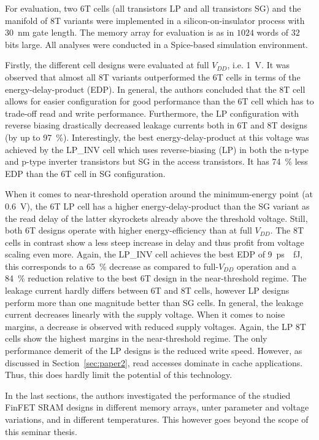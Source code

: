 \documentclass[conference]{IEEEtran}
\begin{document}
For evaluation, two 6T cells (all transistors LP and all transistors SG) and the manifold of 8T variants were implemented in a silicon-on-insulator process with \SI{30}{nm} gate length. The memory array for evaluation is as in \cite{Gupta2019} $1024$ words of $32$ bits large. All analyses were conducted in a Spice-based simulation environment.

Firstly, the different cell designs were evaluated at full $V_{DD}$, i.e. \SI{1}{V}. It was observed that almost all 8T variants outperformed the 6T cells in terms of the energy-delay-product (EDP). In general, the authors concluded that the 8T cell allows for easier configuration for good performance than the 6T cell which has to trade-off read and write performance. Furthermore, the LP configuration with reverse biasing drastically decreased leakage currents both in 6T and 8T designs (by up to \SI{97}{\%}). Interestingly, the best energy-delay-product at this voltage was achieved by the LP\_INV cell which uses reverse-biasing (LP) in both the n-type and p-type inverter transistors but SG in the access transistors. It has \SI{74}{\%} less EDP than the 6T cell in SG configuration.

When it comes to near-threshold operation around the minimum-energy point (at \SI{0.6}{V}), the 6T LP cell has a higher energy-delay-product than the SG variant as the read delay of the latter skyrockets already above the threshold voltage. Still, both 6T designs operate with higher energy-efficiency than at full $V_{DD}$. The 8T cells in contrast show a less steep increase in delay and thus profit from voltage scaling even more. Again, the LP\_INV cell achieves the best EDP of \SI{9}{ps \cdot fJ}, this corresponds to a \SI{65}{\%} decrease as compared to full-$V_{DD}$ operation and a \SI{84}{\%} reduction relative to the best 6T design in the near-threshold regime. The leakage current hardly differs between 6T and 8T cells, however LP designs perform more than one magnitude better than SG cells. In general, the leakage current decreases linearly with the supply voltage. When it comes to noise margins, a decrease is observed with reduced supply voltages. Again, the LP 8T cells show the highest margins in the near-threshold regime. The only performance demerit of the LP designs is the reduced write speed. However, as discussed in Section~\ref{sec:paper2}, read accesses dominate in cache applications. Thus, this does hardly limit the potential of this technology.

In the last sections, the authors investigated the performance of the studied FinFET SRAM designs in different memory arrays, unter parameter and voltage variations, and in different temperatures. This however goes beyond the scope of this seminar thesis.
\end{document}
